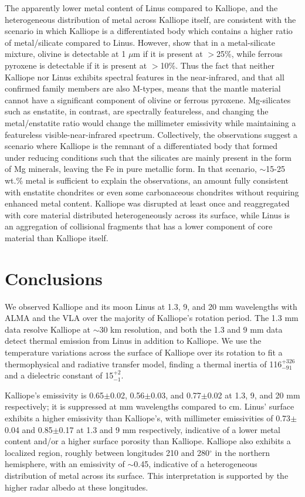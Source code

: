 \documentclass[]{aastex631}
\begin{document}
The apparently lower metal content of Linus compared to Kalliope, and the heterogeneous distribution of metal across Kalliope itself, are consistent with the scenario in which Kalliope is a differentiated body which contains a higher ratio of metal/silicate compared to Linus. However, \cite{cloutis1990} show that in a metal-silicate mixture, olivine is detectable at 1 $\mu$m if it is present at $>$25\%, while ferrous pyroxene is detectable if it is present at $>$10\%. Thus the fact that neither Kalliope nor Linus exhibits spectral features in the near-infrared, and that all confirmed family members are also M-types, means that the mantle material cannot have a significant component of olivine or ferrous pyroxene. Mg-silicates such as enstatite, in contrast, are spectrally featureless, and changing the metal/enstatite ratio would change the millimeter emissivity while maintaining a featureless visible-near-infrared spectrum. Collectively, the observations suggest a scenario where Kalliope is the remnant of a differentiated body that formed under reducing conditions such that the silicates are mainly present in the form of Mg minerals, leaving the Fe in pure metallic form. In that scenario, $\sim$15-25 wt.\% metal is sufficient to explain the observations, an amount fully consistent with enstatite chondrites or even some carbonaceous chondrites without requiring enhanced metal content. Kalliope was disrupted at least once and reaggregated with core material distributed heterogeneously across its surface, while Linus is an aggregation of collisional fragments that has a lower component of core material than Kalliope itself.
%
\section{Conclusions} \label{sec:conc}
%
We observed Kalliope and its moon Linus at 1.3, 9, and 20 mm wavelengths with ALMA and the VLA over the majority of Kalliope's rotation period. The 1.3 mm data resolve Kalliope at $\sim$30 km resolution, and both the 1.3 and 9 mm data detect thermal emission from Linus in addition to Kalliope. We use the temperature variations across the surface of Kalliope over its rotation to fit a thermophysical and radiative transfer model, finding a thermal inertia of 116$^{+326}_{-91}$ and a dielectric constant of 15$^{+2}_{-1}$.

Kalliope's emissivity is 0.65$\pm$0.02, 0.56$\pm$0.03, and 0.77$\pm$0.02 at 1.3, 9, and 20 mm respectively; it is suppressed at mm wavelengths compared to cm. Linus' surface exhibits a higher emissivity than Kalliope's, with millimeter emissivities of 0.73$\pm$0.04 and 0.85$\pm$0.17 at 1.3 and 9 mm respectively, indicative of a lower metal content and/or a higher surface porosity than Kalliope. Kalliope also exhibits a localized region, roughly between longitudes 210 and 280$^{\circ}$ in the northern hemisphere, with an emissivity of $\sim$0.45, indicative of a heterogeneous distribution of metal across its surface. This interpretation is supported by the higher radar albedo at these longitudes.
\end{document}
